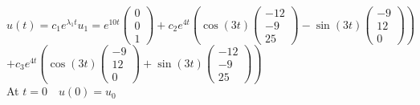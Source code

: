 \documentclass[12pt,a4paper]{article}
\begin{document}
\begin{itemize}
\begin{itemize}
$u(t)=c_{1}e^{\lambda_{1}t}u_{1}=e^{10t}\begin{pmatrix} 0 \\ 0 \\1 \end{pmatrix}+c_{2}e^{4t}\left(\cos\left(3t\right)\begin{pmatrix} -12 \\ -9 \\25\end{pmatrix}-\sin\left(3t\right)\begin{pmatrix} -9 \\ 12 \\0\end{pmatrix}\right)$ \\
$+c_{3}e^{4t}\left(\cos\left(3t\right)\begin{pmatrix} -9 \\ 12 \\0\end{pmatrix}+\sin\left(3t\right)\begin{pmatrix} -12 \\ -9 \\25\end{pmatrix}\right)$\\
At $t=0 \quad u\left(0\right)=u_{0}$


\end{itemize}
\end{itemize}
\end{document}
